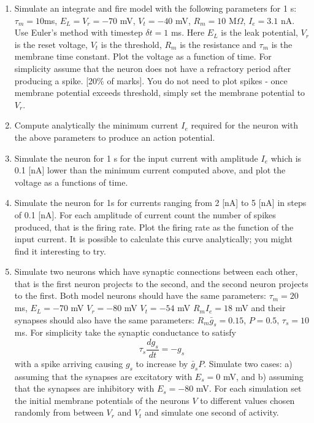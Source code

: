 \documentclass[11pt,a4paper]{scrartcl}
\begin{document}
\begin{enumerate}

\item Simulate an integrate and fire model with the following
  parameters for 1 s: $\tau_m = 10 $ms, $E_L = V_r = -70$ mV, $V_t =
  -40$ mV, $R_m= 10$ M$\Omega$, $I_e = 3.1 $ nA. Use Euler's method
  with timestep $\delta t = 1$ ms. Here $E_L$ is the leak potential,
  $V_r$ is the reset voltage, $V_t$ is the threshold, $R_m$ is the
  resistance and $\tau_m$ is the membrane time constant. Plot the
  voltage as a function of time. For simplicity assume that the neuron
  does not have a refractory period after producing a spike. [20\% of
    marks]. You do not need to plot spikes - once membrane potential
  exceeds threshold, simply set the membrane potential to $V_r$.

\item Compute analytically the minimum current $I_e$ required for the
  neuron with the above parameters to produce an action
  potential.

\item Simulate the neuron for 1 s for the input current with amplitude
  $I_e$ which is 0.1 [nA] lower than the minimum current computed
  above, and plot the voltage as a functions of time.

\item Simulate the neuron for 1s for currents ranging from 2 [nA] to 5
  [nA] in steps of 0.1 [nA]. For each amplitude of current count the
  number of spikes produced, that is the firing rate. Plot the firing
  rate as the function of the input current. It is possible to
  calculate this curve analytically; you might find it interesting to
  try.

\item Simulate two neurons which have synaptic connections between
  each other, that is the first neuron projects to the second, and the
  second neuron projects to the first. Both model neurons should have
  the same parameters: $\tau_m = 20$ ms, $E_L = -70$ mV $V_r = -80$ mV
  $V_t = -54$ mV $R_mI_e = 18$ mV and their synapses should also have
  the same parameters: $R_m \bar{g}_s = 0.15$, $P = 0.5$, $\tau_s= 10$
  ms. For simplicity take the synaptic conductance to satisfy
\begin{equation}
\tau_s\frac{dg_s}{dt}=-g_s
\end{equation}
with a spike arriving causing $g_s$ to increase by $\bar{g}_sP$. Simulate two cases: a) assuming that the synapses are excitatory with $E_s = 0$ mV, and b) assuming that the synapses are inhibitory with $E_s = -80$ mV. For each simulation set the initial membrane potentials of the neurons $V$ to different values chosen randomly from between $V_r$ and $V_t$ and simulate one second of activity.


\end{enumerate}
\end{document}
